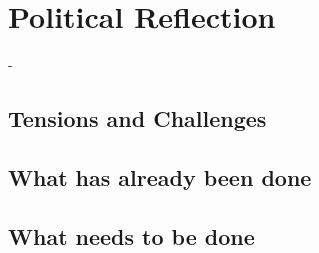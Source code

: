 \section{Political Reflection}
\label{s:poli_reflect}

- 

\subsection{Tensions and Challenges}


\subsection{What has already been done}


\subsection{What needs to be done}

